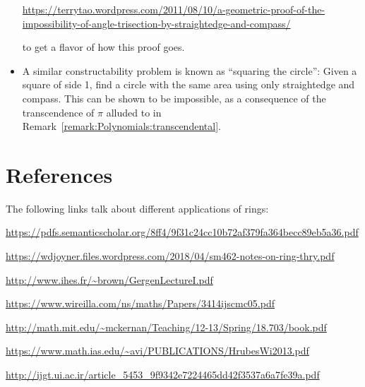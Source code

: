 \begin{itemize}
\noindent
 \footnotesize{\url{https://terrytao.wordpress.com/2011/08/10/a-geometric-proof-of-the-}}\\
 \footnotesize{\url{impossibility-of-angle-trisection-by-straightedge-and-compass/}}

\noindent
 to get a flavor of how this proof goes.
\item
A similar constructability problem is known as ``squaring the circle'':  Given a square of side 1, find a circle with the same area using only straightedge and compass. This can be shown to be impossible, as a consequence of the transcendence of $\pi$ alluded to in Remark~\ref{remark:Polynomials:transcendental}.
\end{itemize}

\section{References}
\label{sec:Rings:References}

The following links talk about different applications of rings:

\noindent \url{https://pdfs.semanticscholar.org/8ff4/9f31c24cc10b72af379fa364becc89eb5a36.pdf}

\noindent \url{https://wdjoyner.files.wordpress.com/2018/04/sm462-notes-on-ring-thry.pdf}

\noindent \url{http://www.ihes.fr/~brown/GergenLectureI.pdf}

\noindent \url{https://www.wireilla.com/ns/maths/Papers/3414ijscmc05.pdf}

\noindent \url{http://math.mit.edu/~mckernan/Teaching/12-13/Spring/18.703/book.pdf}

\noindent \url{https://www.math.ias.edu/~avi/PUBLICATIONS/HrubesWi2013.pdf}

\noindent \url{http://ijgt.ui.ac.ir/article_5453_9f9342e7224465dd42f3537a6a7fe39a.pdf}





